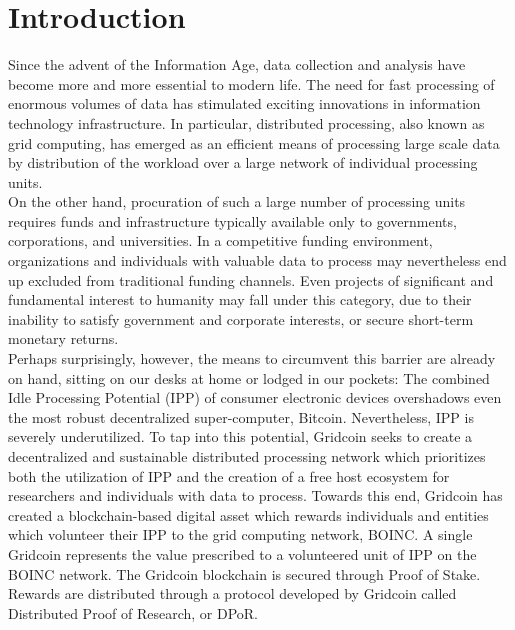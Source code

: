 \section{Introduction}

\label{sec:intro}

Since the advent of the Information Age, data collection and analysis have become more and more essential to modern life. The need for fast processing of enormous volumes of data has stimulated exciting innovations in information technology infrastructure. In particular, distributed processing, also known as grid computing, has emerged as an efficient means of processing large scale data by distribution of the workload over a large network of individual processing units.\\ 

On the other hand, procuration of such a large number of processing units requires funds and infrastructure typically available only to governments, corporations, and universities. In a competitive funding environment, organizations and individuals with valuable data to process may nevertheless end up excluded from traditional funding channels. Even projects of significant and fundamental interest to humanity may fall under this category, due to their inability to satisfy government and corporate interests, or secure short-term monetary returns. \\

Perhaps surprisingly, however, the means to circumvent this barrier are already on hand, sitting on our desks at home or lodged in our pockets: The combined Idle Processing Potential (IPP) of consumer electronic devices overshadows even the most robust decentralized super-computer, Bitcoin. Nevertheless, IPP is severely underutilized. To tap into this potential, Gridcoin seeks to create a decentralized and sustainable distributed processing network which prioritizes both the utilization of IPP and the creation of a free host ecosystem for researchers and individuals with data to process. Towards this end, Gridcoin has created a blockchain-based digital asset which rewards individuals and entities which volunteer their IPP to the grid computing network, BOINC.  A single Gridcoin represents the value prescribed to a volunteered unit of IPP on the BOINC network.  The Gridcoin blockchain is secured through Proof of Stake.  Rewards are distributed through a protocol developed by Gridcoin called Distributed Proof of Research, or DPoR.\\

